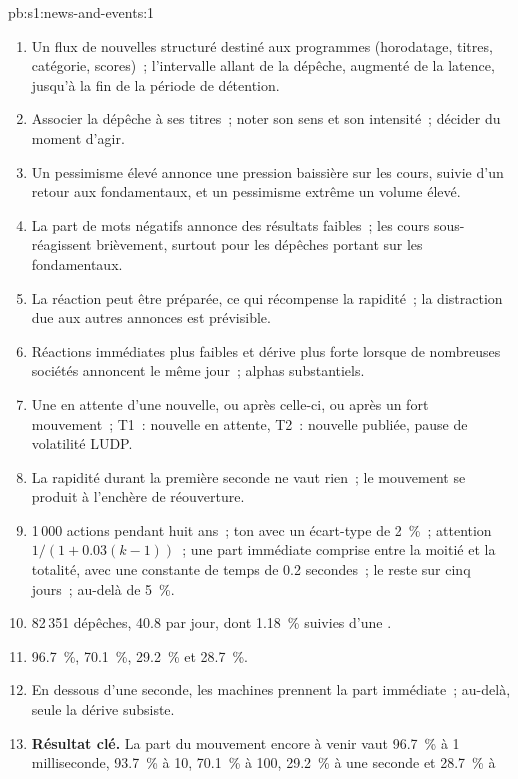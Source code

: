 \begin{solution}{pb:s1:news-and-events:1}
\begin{enumerate}
\item Un flux de nouvelles structuré destiné aux programmes (horodatage, titres, catégorie, scores)~; l'intervalle allant de la dépêche, augmenté de la latence, jusqu'à la fin de la
période de détention.
\item Associer la dépêche à ses titres~; noter son sens et son intensité~; décider du moment d'agir.
\item Un pessimisme élevé annonce une pression baissière sur les cours, suivie d'un retour aux fondamentaux, et un pessimisme extrême un volume élevé.
\item La part de mots négatifs annonce des résultats faibles~; les cours sous-réagissent brièvement, surtout pour les dépêches portant sur les fondamentaux.
\item La réaction peut être préparée, ce qui récompense la rapidité~; la distraction due aux autres annonces est prévisible.
\item Réactions immédiates plus faibles et dérive plus forte lorsque de nombreuses sociétés annoncent le même jour~; alphas substantiels.
\item Une  en attente d'une nouvelle, ou après celle-ci, ou après un fort mouvement~; T1~: nouvelle en attente, T2~: nouvelle publiée, pause de volatilité LUDP.
\item La rapidité durant la première seconde ne vaut rien~; le mouvement se produit à l'enchère de réouverture.
\item 1\,000 actions pendant huit ans~; ton avec un écart-type de 2~\%~; attention $1/(1+0.03(k-1))$~; une part immédiate comprise entre la moitié et la totalité, avec une constante de temps
de 0.2 secondes~; le reste sur cinq jours~;  au-delà de 5~\%.
\item 82\,351 dépêches, 40.8 par jour, dont 1.18~\% suivies d'une .
\item 96.7~\%, 70.1~\%, 29.2~\% et 28.7~\%.
\item En dessous d'une seconde, les machines prennent la part immédiate~; au-delà, seule la dérive subsiste.
\item \textbf{Résultat clé.} La part du mouvement encore à venir vaut 96.7~\% à 1 milliseconde, 93.7~\% à 10, 70.1~\% à 100, 29.2~\% à une seconde et 28.7~\% à

\end{enumerate}
\end{solution}
